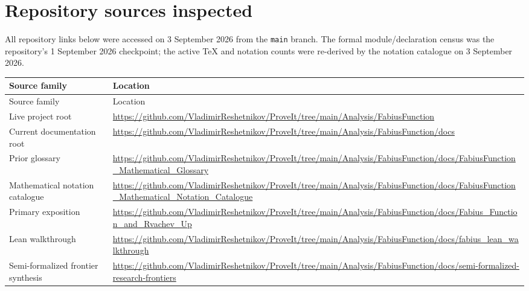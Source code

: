 \documentclass[11pt,oneside]{article}
\begin{document}
\section{Repository sources inspected}
All repository links below were accessed on 3 September 2026 from the
\texttt{main} branch.  The formal module/declaration census was the repository's
1 September 2026 checkpoint; the active TeX and notation counts were re-derived
by the notation catalogue on 3 September 2026.
\begingroup\small\renewcommand{\arraystretch}{1.12}
\begin{longtable}{@{}L{0.27\textwidth}L{0.67\textwidth}@{}}
\toprule Source family & Location\\ \midrule\endfirsthead
\toprule Source family & Location\\ \midrule\endhead
Live project root & \url{https://github.com/VladimirReshetnikov/ProveIt/tree/main/Analysis/FabiusFunction} \\
Current documentation root & \url{https://github.com/VladimirReshetnikov/ProveIt/tree/main/Analysis/FabiusFunction/docs} \\
Prior glossary & \url{https://github.com/VladimirReshetnikov/ProveIt/tree/main/Analysis/FabiusFunction/docs/FabiusFunction_Mathematical_Glossary} \\
Mathematical notation catalogue & \url{https://github.com/VladimirReshetnikov/ProveIt/tree/main/Analysis/FabiusFunction/docs/FabiusFunction_Mathematical_Notation_Catalogue} \\
Primary exposition & \url{https://github.com/VladimirReshetnikov/ProveIt/tree/main/Analysis/FabiusFunction/docs/Fabius_Function_and_Rvachev_Up} \\
Lean walkthrough & \url{https://github.com/VladimirReshetnikov/ProveIt/tree/main/Analysis/FabiusFunction/docs/fabius_lean_walkthrough} \\
Semi-formalized frontier synthesis & \url{https://github.com/VladimirReshetnikov/ProveIt/tree/main/Analysis/FabiusFunction/docs/semi-formalized-research-frontiers} \\
\bottomrule\end{longtable}\endgroup
\end{document}
